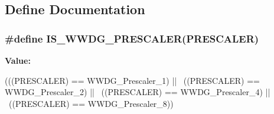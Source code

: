 \subsection{Define Documentation}
\hypertarget{group__WWDG__Prescaler_ga39070de0722a70f99a6fcfe8720b2dfd}{
\subsubsection[{IS\_\-WWDG\_\-PRESCALER}]{\setlength{\rightskip}{0pt plus 5cm}\#define IS\_\-WWDG\_\-PRESCALER(PRESCALER)}}
\label{group__WWDG__Prescaler_ga39070de0722a70f99a6fcfe8720b2dfd}
{\bfseries Value:}
\begin{DoxyCode}
(((PRESCALER) == WWDG_Prescaler_1) || \
                                      ((PRESCALER) == WWDG_Prescaler_2) || \
                                      ((PRESCALER) == WWDG_Prescaler_4) || \
                                      ((PRESCALER) == WWDG_Prescaler_8))
\end{DoxyCode}
